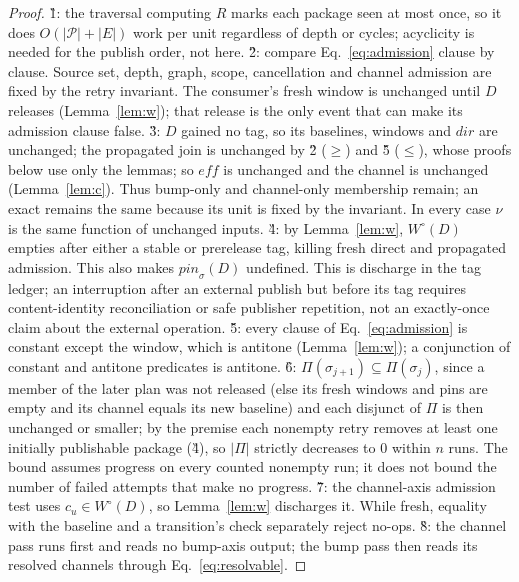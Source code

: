 \begin{proof}
\G{1}: the traversal computing $R$ marks each package seen at most
once, so it does $O(|\mathcal{P}|{+}|E|)$ work per unit regardless of
depth or cycles; acyclicity is needed for the publish order, not here.
\G{2}: compare Eq.~\ref{eq:admission} clause by clause. Source set,
depth, graph, scope, cancellation and channel admission are fixed by the
retry invariant. The consumer's fresh window is unchanged until $D$
releases (Lemma~\ref{lem:w}); that release is the only event that can
make its admission clause false.
\G{3}: $D$ gained no tag, so its baselines, windows and
$\mathit{dir}$ are unchanged; the propagated join is unchanged by \G{2}
($\geq$) and \G{5} ($\leq$), whose proofs below use only the lemmas; so
$\mathit{eff}$ is unchanged and the channel is unchanged
(Lemma~\ref{lem:c}). Thus bump-only and channel-only membership remain;
an exact  remains the same because its unit is fixed by the
invariant. In every case $\nu$ is the same function of unchanged inputs.
\G{4}: by Lemma~\ref{lem:w}, $W^\circ(D)$ empties after either a stable
or prerelease tag, killing fresh direct and propagated admission. This
also makes $\mathit{pin}_\sigma(D)$ undefined. This is discharge in the tag
ledger; an interruption after an external publish
but before its tag requires content-identity reconciliation or safe publisher repetition, not
an exactly-once claim about the external operation.
\G{5}: every clause of Eq.~\ref{eq:admission} is constant except the
window, which is antitone (Lemma~\ref{lem:w}); a conjunction of
constant and antitone predicates is antitone.
\G{6}: $\Pi(\sigma_{j+1}) \subseteq \Pi(\sigma_j)$, since a member of
the later plan was not released (else its fresh windows and pins are empty and its channel equals its new baseline) and each disjunct of
$\Pi$ is then unchanged or smaller; by the premise each nonempty retry
removes at least one initially publishable package (\G{4}), so $|\Pi|$
strictly decreases to $0$ within
$n$ runs. The bound assumes progress on every counted nonempty run; it does not bound
the number of failed attempts that make no progress.
\G{7}: the channel-axis admission test uses $c_u\in W^\circ(D)$, so
Lemma~\ref{lem:w} discharges it. While fresh, equality with the baseline
and a transition's  check separately reject no-ops.
\G{8}: the channel pass runs first and reads no bump-axis output; the bump
pass then reads its resolved channels through Eq.~\ref{eq:resolvable}.
\end{proof}

